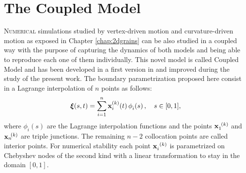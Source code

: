 \chapter{The Coupled Model}
\label{chap:coupledmodel}

\lettrine{N}{umerical} simulations studied by vertex-driven motion and curvature-driven motion as exposed in Chapter \ref{chap:2dgrains} can be also studied in a coupled way with the purpose of capturing the dynamics of both models and being able to reproduce each one of them individually. This novel model is called Coupled Model and has been developed in a first version in \cite{bachelorthesisasazo} and improved during the study of the present work. The boundary parametrization proposed here consist in a Lagrange interpolation of $n$ points as follows:
\begin{equation}
    \vxi(s,t) = \boundary,\quad s \in [0,1],
    \label{eq:boundarydiscret}
\end{equation}
where $\phi_i(s)$ are the Lagrange interpolation functions and the points $\x[1]^{(k)}$ and $\x[n]^{(k)}$ are triple junctions. The remaining $n-2$ collocation points are called interior points. For numerical stability each point $\x[i]^{(k)}$ is parametrized on Chebyshev nodes of the second kind\cite{trefethen2000spectral} with a linear transformation to stay in the domain $[0,1]$.

